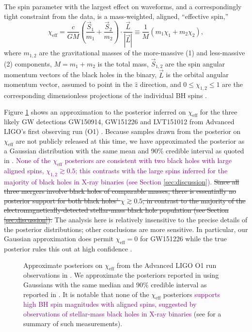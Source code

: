 \documentclass[modern,linenumbers]{aastex61}
\newcommand{\chieff}{\chi_\mathrm{eff}}
\newcommand{\ilya}[1]{\textcolor{purple}{#1}}
\begin{document}
The spin parameter with the largest effect on waveforms, and a
correspondingly tight constraint from the data, is a mass-weighted,
aligned, ``effective spin,''
\begin{equation}
  \chieff = \frac{c}{GM} \left( \frac{\vec{S}_1}{m_1} + \frac{\vec{S}_2}{m_2}
  \right) \cdot \frac{\vec{L}}{\left| \vec{L} \right|} \equiv \frac{1}{M} \left( m_1 \chi_1 + m_2 \chi_2 \right),
\end{equation}
where $m_{1,2}$ are the gravitational masses of the more-massive (1)
and less-massive (2) components, $M = m_1 + m_2$ is the total mass,
$\vec{S}_{1,2}$ are the spin angular momentum vectors of the black
holes in the binary, $\vec{L}$ is the orbital angular momentum vector,
assumed to point in the $\hat{z}$ direction, and
$0 \leq \chi_{1,2} \leq 1$ are the corresponding dimensionless
projections of the individual \ac{BH} spins
\citep{2016PhRvL.116x1102A}.

Figure \ref{fig:O1-posteriors} shows an approximation to the posterior
inferred on $\chieff$ for the three likely \ac{GW} detections
GW150914, GW151226 and LVT151012 from Advanced LIGO's first observing
run (O1) \citep{O1-BBH}.  Because samples drawn from the posterior on
$\chieff$ are not publicly released at this time, we have approximated
the posterior as a Gaussian distribution with the same mean and 90\%
credible interval as quoted in \citet{O1-BBH}.  \ilya{None of the $\chieff$ posteriors are consistent with two black holes with large aligned spins, $\chi_{1,2} \gtrsim 0.5$; this contrasts with the large spins inferred for the majority of black holes in X-ray binaries  (see Section \ref{sec:discussion}).}
\sout{Since all three
mergers involve black holes of comparable masses, there is essentially
no posterior support for both black holes' $\chi \gtrsim 0.5$, in
contrast to the majority of the electromagnetically-detected
stellar-mass black hole population (see Section \ref{sec:discussion}).}
The analysis here is relatively insensitive to the precise details of
the posterior distributions; other conclusions are more sensitive.  In
particular, our Gaussian approximation does permit $\chieff = 0$ for
GW151226 while the true posterior rules this out at high confidence
\citep{2016PhRvL.116x1103A,O1-BBH}.

\begin{figure}
  \caption{\label{fig:O1-posteriors} Approximate posteriors on
    $\chieff$ from the Advanced LIGO O1 run observations in
    \citet{O1-BBH}.  We approximate the posteriors reported in
    \citet{O1-BBH} using Gaussians with the same median and 90\%
    credible interval as reported in \citet{O1-BBH}.  It is notable
    that none of the $\chieff$ posteriors \ilya{supports high \ac{BH}
    spin magnitudes with aligned spins, suggested by observations of stellar-mass black holes in  X-ray binaries} (see
    \citet{2015PhR...548....1M} for a summary of such measurements).}
\end{figure}
\end{document}
